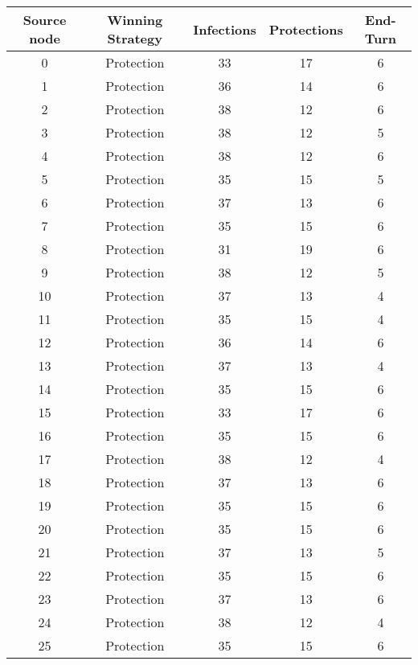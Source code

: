 \documentclass[results.tex]{subfiles}
\begin{document}
\begin{center}
  \begin{tabular}{| c || c | c | c | c |}
    \hline
    {\bfseries Source node} & {\bfseries Winning Strategy} & {\bfseries Infections} & {\bfseries Protections} & {\bfseries End-Turn} \\  %
    \hline\hline
    0 & Protection & 33 & 17 & 6 \\ 
    \hline
    1 & Protection & 36 & 14 & 6 \\ 
    \hline
    2 & Protection & 38 & 12 & 6 \\ 
    \hline
    3 & Protection & 38 & 12 & 5 \\ 
    \hline
    4 & Protection & 38 & 12 & 6 \\ 
    \hline
    5 & Protection & 35 & 15 & 5 \\ 
    \hline
    6 & Protection & 37 & 13 & 6 \\ 
    \hline
    7 & Protection & 35 & 15 & 6 \\ 
    \hline
    8 & Protection & 31 & 19 & 6 \\ 
    \hline
    9 & Protection & 38 & 12 & 5 \\ 
    \hline
    10 & Protection & 37 & 13 & 4 \\ 
    \hline
    11 & Protection & 35 & 15 & 4 \\ 
    \hline
    12 & Protection & 36 & 14 & 6 \\ 
    \hline
    13 & Protection & 37 & 13 & 4 \\ 
    \hline
    14 & Protection & 35 & 15 & 6 \\ 
    \hline
    15 & Protection & 33 & 17 & 6 \\ 
    \hline
    16 & Protection & 35 & 15 & 6 \\ 
    \hline
    17 & Protection & 38 & 12 & 4 \\ 
    \hline
    18 & Protection & 37 & 13 & 6 \\ 
    \hline
    19 & Protection & 35 & 15 & 6 \\ 
    \hline
    20 & Protection & 35 & 15 & 6 \\ 
    \hline
    21 & Protection & 37 & 13 & 5 \\ 
    \hline
    22 & Protection & 35 & 15 & 6 \\ 
    \hline
    23 & Protection & 37 & 13 & 6 \\ 
    \hline
    24 & Protection & 38 & 12 & 4 \\ 
    \hline
    25 & Protection & 35 & 15 & 6 \\ 

\end{tabular}
\end{center}
\end{document}
